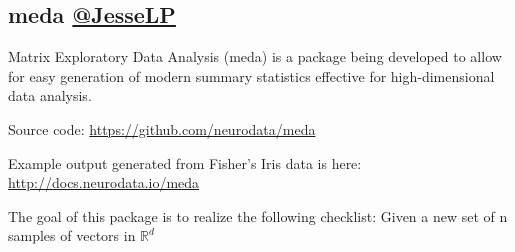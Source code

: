 \documentclass[simplex.tex]{subfiles}
\begin{document}
\subsection[meda]{meda \href{https://github.com/mrae}{@JesseLP}}
Matrix Exploratory Data Analysis (meda) is a package being developed to
allow for easy generation of modern summary statistics effective for
high-dimensional data analysis. 

\begin{compactitem}
  \item Source code: \href{https://github.com/neurodata/meda}{https://github.com/neurodata/meda}
  \item Example output generated from Fisher's Iris data is here:
    \href{http://docs.neurodata.io/meda}{http://docs.neurodata.io/meda}
\end{compactitem}

The goal of this package is to realize the following checklist: Given a new set of n samples of vectors in $\mathbb{R}^d$
\end{document}
